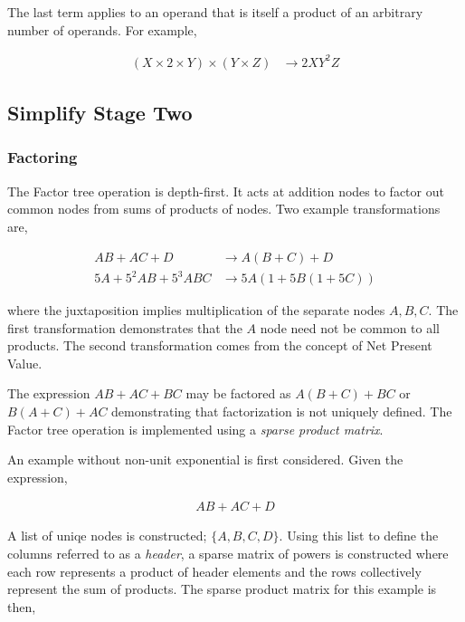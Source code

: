 The last term applies to an operand that is itself a product of an arbitrary number of operands. For example,

\begin{align*}
(X \times 2 \times Y) \times (Y \times Z) &\rightarrow 2XY^2Z
\end{align*}

\subsection{Simplify Stage Two}


\subsubsection{Factoring}
The Factor tree operation is depth-first. It acts at addition nodes to factor out common nodes from sums of products of nodes. Two example transformations are,

\begin{align*}
AB + AC + D         &\rightarrow  A(B+C) + D\\
5A + 5^2AB + 5^3ABC &\rightarrow  5A(1 + 5B(1 + 5C))
\end{align*}

where the juxtaposition implies multiplication of the separate nodes $A, B, C$. The first transformation demonstrates that the $A$ node need not be common to all products. The second transformation comes from the concept of Net Present Value.


The expression $AB + AC + BC$ may be factored as $A(B+C) + BC$ or $B(A+C) + AC$ demonstrating that factorization is not uniquely defined. The Factor tree operation is implemented using a \emph{sparse product matrix}. 

An example without non-unit exponential is first considered. Given the expression,

\begin{align*}
AB + AC + D
\end{align*}

A list of uniqe nodes is constructed; $\{A, B, C, D\}$. Using this list to define the columns referred to as a \emph{header}, a sparse matrix of powers is constructed where each row represents a product of header elements and the rows collectively represent the sum of products. The sparse product matrix for this example is then,


